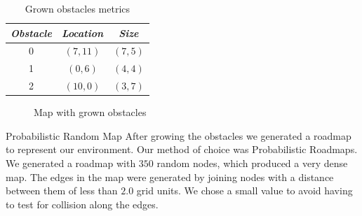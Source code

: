 \documentclass[conference]{IEEEtran}
\makeatletter
\renewcommand\section{\@startsection{section}{1}{\z@}
                                  {-3.0ex plus -1.5ex minus -0.5ex}
                                  {0.7ex plus 1ex minus 0ex}
                                  {\bfseries}}
\makeatother
\begin{document}
\begin{table}[h]
\centering
\caption{Grown obstacles metrics}
\begin{tabular}{|c|c|c|}
\hline 
\textit{ \textbf{Obstacle}} & \textit{ \textbf{Location}} & \textit{ \textbf{Size}}\\
\hline 
0 & $(7, 11)$ & $(7, 5)$ \\
1 & $(0, 6)$ & $(4, 4)$ \\
2 & $(10, 0)$ & $(3, 7)$ \\ 
\hline
\end{tabular}
\label{tab:grownObstacles}
\end{table} 

\begin{figure}[h]
	\centering
	\caption{Map with grown obstacles}
	\label{fig:grownObstaclesMap}
\end{figure} 

\section{Probabilistic Random Map}
\label{sec:Roadmap}
After growing the obstacles we generated a roadmap to represent
our environment. Our method of choice was Probabilistic Roadmaps.
We generated a roadmap with $350$ random nodes, which produced a very dense map.
The edges in the map were generated by joining nodes with a distance
between them of less than $2.0$ grid units. We chose a small value 
to avoid having to test for collision along the edges.
\end{document}
